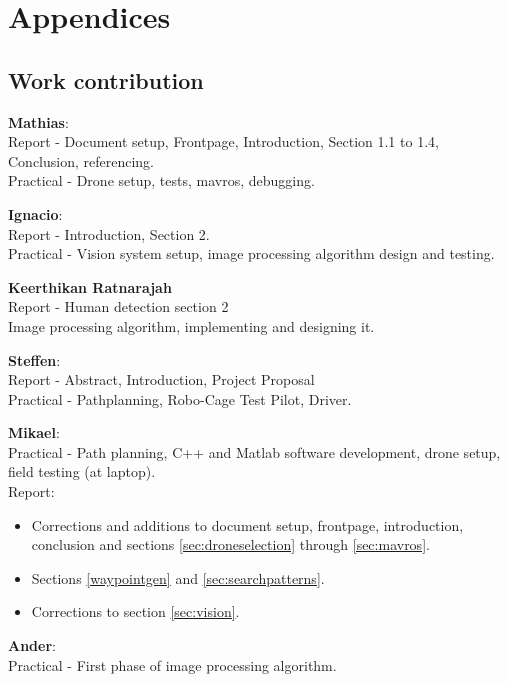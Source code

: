 \part*{Appendices}
\appendix
\chapter{Work contribution}
\label{app:work}
\textbf{Mathias}:\\
Report - Document setup, Frontpage,  Introduction, Section  1.1 to 1.4, Conclusion, referencing.\\
Practical - Drone setup, tests, mavros, debugging.

\textbf{Ignacio}:\\
Report - Introduction, Section  2.\\
Practical - Vision system setup, image processing algorithm design and testing.

\textbf{Keerthikan Ratnarajah}\\
Report - Human detection section 2\\
Image processing algorithm, implementing and designing it.
 
\textbf{Steffen}:\\
Report - Abstract, Introduction, Project Proposal \\
Practical - Pathplanning, 
Robo-Cage Test Pilot, Driver.

\textbf{Mikael}:\\
Practical - Path planning, C++ and Matlab software development, drone setup, field testing (at laptop).\\
Report:
\begin{itemize}
\item Corrections and additions to document setup, frontpage, introduction, conclusion and sections \ref{sec:droneselection} through \ref{sec:mavros}.
\item Sections \ref{waypointgen} and \ref{sec:searchpatterns}.
\item Corrections to section \ref{sec:vision}.
\end{itemize}

\textbf{Ander}:\\
Practical - First phase of image processing algorithm.

